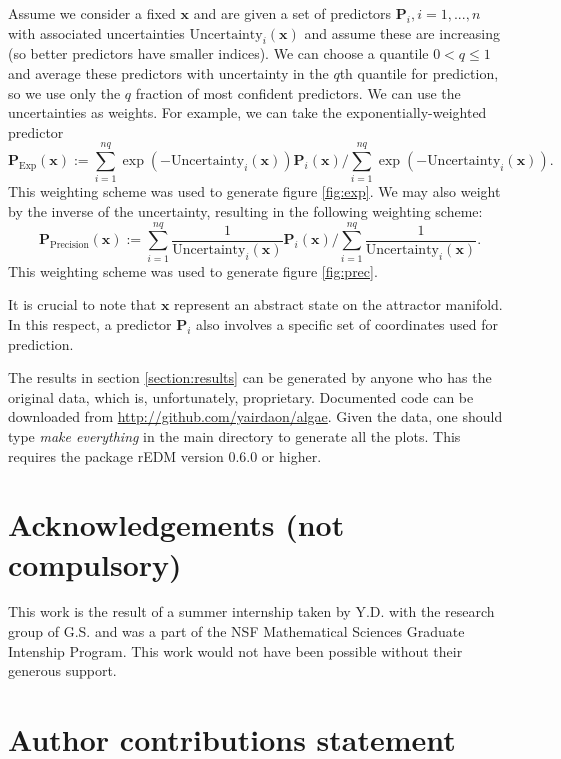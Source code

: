 \documentclass[fleqn,10pt]{wlscirep}
\newcommand{\un}{\text{Uncertainty}}
\newcommand{\x}{\mathbf{x}}
\newcommand{\pred}{\mathbf{P}}
\begin{document}
Assume we consider a fixed $\x$ and are given a set of predictors
$\pred_i, i =1,...,n$ with associated uncertainties $\un_i(\x)$ and
assume these are increasing (so better predictors have smaller
indices). We can choose a quantile $0 < q \leq 1$ and average these
predictors with uncertainty in the $q$th quantile for prediction, so
we use only the $q$ fraction of most confident predictors. We can use
the uncertainties as weights. For example, we can take the
exponentially-weighted predictor
\begin{equation*}
  \pred_{\text{Exp}} (\x ) := \sum_{i=1}^{nq} \exp(-\un_i(\x)) \pred_i(\x) / \sum_{i=1}^{nq} \exp(-\un_i(\x)).
\end{equation*}
 This weighting scheme was used to generate figure \ref{fig:exp}. We
 may also weight by the inverse of the uncertainty, resulting in the
 following weighting scheme:
\begin{equation*}
  \pred_{\text{Precision}} (\x ) := \sum_{i=1}^{nq} \frac{1}{\un_i(\x)} \pred_i(\x) / \sum_{i=1}^{nq} \frac{1}{\un_i(\x)}.
\end{equation*}
This weighting scheme was used to generate figure \ref{fig:prec}.

It is crucial to note that $\x$ represent an abstract state on the
attractor manifold. In this respect, a predictor $\pred_i$ also
involves a specific set of coordinates used for prediction.

The results in section \ref{section:results} can be generated by
anyone who has the original data, which is, unfortunately,
proprietary. Documented code can be downloaded from
\url{http://github.com/yairdaon/algae}. Given the data, one should
type \emph{make everything} in the main directory to generate all the
plots. This requires the package rEDM version 0.6.0 or higher.



\section*{Acknowledgements (not compulsory)}
This work is the result of a summer internship taken by Y.D. with the
research group of G.S. and was a part of the NSF Mathematical Sciences
Graduate Intenship Program. This work would not have been possible
without their generous support.

\section*{Author contributions statement}
\end{document}
